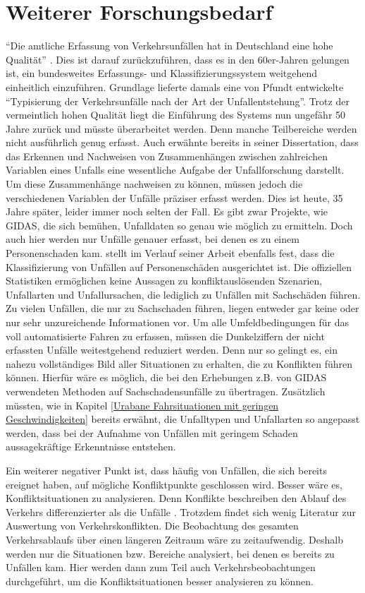 \section{Weiterer Forschungsbedarf}
\enquote{Die amtliche Erfassung von Verkehrsunfällen hat in Deutschland eine hohe Qualität} \parencite[S. 821]{Brilon.2016}. Dies ist darauf zurückzuführen, dass es in den 60er-Jahren gelungen ist, ein bundesweites Erfassungs- und Klassifizierungssystem weitgehend einheitlich einzuführen. Grundlage lieferte damals eine von Pfundt entwickelte \enquote{Typisierung der Verkehrsunfälle nach der Art der Unfallentstehung}. Trotz der vermeintlich hohen Qualität liegt die Einführung des Systems nun ungefähr 50 Jahre zurück und müsste überarbeitet werden. Denn manche Teilbereiche werden nicht ausführlich genug erfasst. Auch \Textcite[S. 69]{Burger.1983} erwähnte bereits in seiner Dissertation, dass das Erkennen und Nachweisen von Zusammenhängen zwischen zahlreichen Variablen eines Unfalls eine wesentliche Aufgabe der Unfallforschung darstellt. Um diese Zusammenhänge nachweisen zu können, müssen jedoch die verschiedenen Variablen der Unfälle präziser erfasst werden. Dies ist heute, 35 Jahre später, leider immer noch selten der Fall. Es gibt zwar Projekte, wie \ac{GIDAS}, die sich bemühen, Unfalldaten so genau wie möglich zu ermitteln. Doch auch hier werden nur Unfälle genauer erfasst, bei denen es zu einem Personenschaden kam. \Textcite[S. 18]{Gschwendtner.2015} stellt im Verlauf seiner Arbeit ebenfalls fest, dass die Klassifizierung von Unfällen auf Personenschäden ausgerichtet ist. Die offiziellen Statistiken ermöglichen keine Aussagen zu konfliktauslösenden Szenarien, Unfallarten und Unfallursachen, die lediglich zu Unfällen mit Sachschäden führen. Zu vielen Unfällen, die nur zu Sachschaden führen, liegen entweder gar keine oder nur sehr unzureichende Informationen vor. Um alle Umfeldbedingungen für das voll automatisierte Fahren zu erfassen, müssen die Dunkelziffern der nicht erfassten Unfälle weitestgehend reduziert werden. Denn nur so gelingt es, ein nahezu vollständiges Bild aller Situationen zu erhalten, die zu Konflikten führen können. Hierfür wäre es möglich, die bei den Erhebungen z.B. von \ac{GIDAS} verwendeten Methoden auf Sachschadensunfälle zu übertragen. Zusätzlich müssten, wie in Kapitel \ref{Urabane Fahrsituationen mit geringen Geschwindigkeiten} bereits erwähnt, die Unfalltypen und Unfallarten so angepasst werden, dass bei der Aufnahme von Unfällen mit geringem Schaden aussagekräftige Erkenntnisse entstehen.
  
Ein weiterer negativer Punkt ist, dass häufig von Unfällen, die sich bereits ereignet haben, auf mögliche Konfliktpunkte geschlossen wird. Besser wäre es, Konfliktsituationen zu analysieren. Denn Konflikte beschreiben den Ablauf des Verkehrs differenzierter als die Unfälle \parencite[S. 13]{Erke.1978}. Trotzdem findet sich wenig Literatur zur Auswertung von Verkehrskonflikten. Die Beobachtung des gesamten Verkehrsablaufs über einen längeren Zeitraum wäre zu zeitaufwendig. Deshalb werden nur die Situationen bzw. Bereiche analysiert, bei denen es bereits zu Unfällen kam. Hier werden dann zum Teil auch Verkehrsbeobachtungen durchgeführt, um die Konfliktsituationen besser analysieren zu können.
